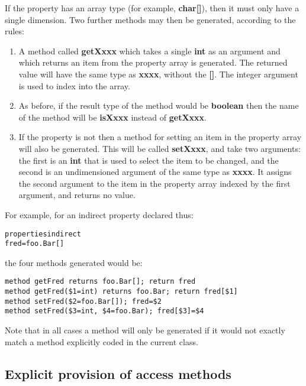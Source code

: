 If the property has an array type (for example, \textbf{char[]}),
then it must only have a single dimension.
Two further methods may then be generated, according to the rules:
\begin{enumerate}
\item A method called \textbf{getXxxx} which takes a single \textbf{int}
as an argument and which returns an item from the property array is
generated. The returned value will have the same type as \textbf{xxxx},
without the \textbf{[]}.  The integer argument is used to
index into the array.
\item As before, if the result type of the method would be \textbf{boolean}
then the name of the method will be \textbf{isXxxx} instead
of \textbf{getXxxx}.
\item If the property is not  then a method for setting an
item in the property array will also be generated.
This will be called \textbf{setXxxx}, and take two arguments: the
first is an \textbf{int} that is used to select the item to be
changed, and the second is an undimensioned argument of the same type
as \textbf{xxxx}.  It assigns the second argument to the item in the
property array indexed by the first argument, and returns no value.
\end{enumerate}
 For example, for an indirect property declared thus:
\begin{alltt}
properties indirect
  fred=foo.Bar[]
\end{alltt}
the four methods generated would be:
\begin{lstlisting}[label=fred,caption=getFred/setFred]
method getFred returns foo.Bar[]; return fred
method getFred($1=int) returns foo.Bar; return fred[$1]
method setFred($2=foo.Bar[]); fred=$2
method setFred($3=int, $4=foo.Bar); fred[$3]=$4
\end{lstlisting}
 
Note that in all cases a method will only be generated if it would not
exactly
match a method explicitly coded in the current class.
\subsection{Explicit provision of access methods}
 
